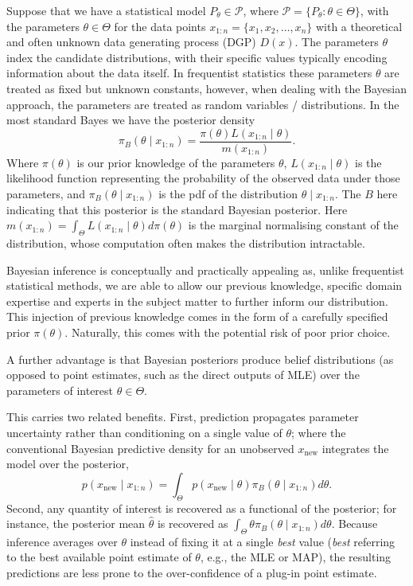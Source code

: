 \documentclass[mstat,12pt]{unswthesis}
\begin{document}
Suppose that we have a statistical model $P_\theta \in \mathcal{P}$, where $\mathcal{P} = \{P_\theta : \theta \in \Theta\}$, with the parameters $\theta \in \Theta$ for the data points $x_{1:n} = \{x_1, x_2, \dots, x_n\}$ with a theoretical and often unknown data generating process (DGP) $D(x)$.
The parameters $\theta$ index the candidate distributions, with their specific values typically encoding information about the data itself.
In frequentist statistics these parameters $\theta$ are treated as fixed but unknown constants, however, when dealing with the Bayesian approach, the parameters are treated as random variables / distributions. In the most standard Bayes we have the posterior density $$\pi_B(\theta \mid x_{1:n}) = \frac{\pi(\theta) L(x_{1:n}\mid\theta)}{m(x_{1:n})}\text{.}$$
Where $\pi(\theta)$ is our prior knowledge of the parameters $\theta$, $L(x_{1:n} \mid \theta)$ is the likelihood function representing the probability of the observed data under those parameters, and $\pi_B(\theta \mid x_{1:n})$ is the pdf of the distribution $\theta \mid x_{1:n}$. The $B$ here indicating that this posterior is the standard Bayesian posterior.
Here $m(x_{1:n}) = \int_{\Theta} L(x_{1:n} \mid \theta) d\pi(\theta)$ is the marginal normalising constant of the distribution, whose computation often makes the distribution intractable.

Bayesian inference is conceptually and practically appealing as, unlike frequentist statistical methods, we are able to allow our previous knowledge, specific domain expertise and experts in the subject matter to further inform our distribution. This injection of previous knowledge comes in the form of a carefully specified prior $\pi(\theta)$. Naturally, this comes with the potential risk of poor prior choice.
\vspace{1.5em}

A further advantage is that Bayesian posteriors produce belief distributions (as opposed to point estimates, such as the direct outputs of MLE) over the parameters of interest $\theta \in \Theta$.

This carries two related benefits. First, prediction propagates parameter uncertainty rather than conditioning on a single value of $\theta$; where the conventional Bayesian predictive density for an unobserved $x_{\text{new}}$ integrates the model over the posterior,
\begin{equation}
    p(x_{\text{new}} \mid x_{1:n}) = \int_{\Theta} p(x_{\text{new}} \mid \theta)\pi_B(\theta \mid x_{1:n})d\theta.\label{eq:prediction}
\end{equation}
Second, any quantity of interest is recovered as a functional of the posterior; for instance, the posterior mean $\hat{\theta}$ is recovered as $\int_{\Theta} \theta\pi_B(\theta \mid x_{1:n})d\theta$. Because inference averages over $\theta$ instead of fixing it at a single \emph{best} value (\emph{best} referring to the best available point estimate of $\theta$, e.g., the MLE or MAP), the resulting predictions are less prone to the over-confidence of a plug-in point estimate.
\end{document}
